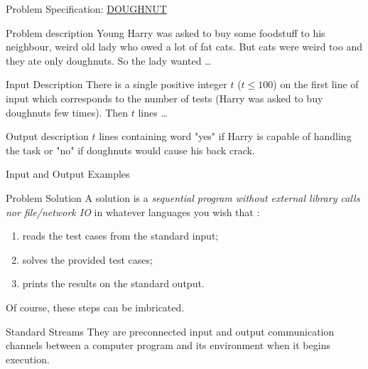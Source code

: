 \documentclass{beamer}
\begin{document}

\begin{frame}{Problem Specification: \href{https://www.spoj.com/problems/DOUGHNUT/}{DOUGHNUT}}
  \begin{block}{Problem description}
    Young Harry was asked to buy some foodstuff to his neighbour, weird old lady who owed a lot of fat cats. But cats were weird too and they ate only doughnuts. So the lady wanted \dots
  \end{block}

  \begin{block}{Input Description}
    There is a single positive integer $t$ ($t \leq 100$) on the first line of input which corresponds to the number of tests (Harry was asked to buy doughnuts few times). Then $t$ lines \dots
  \end{block}

  \begin{block}{Output description}
    $t$ lines containing word "yes" if Harry is capable of handling the task or "no" if doughnuts would cause his back crack.
  \end{block}

  \begin{block}{Input and Output Examples}
  \end{block}

\end{frame}




\begin{frame}{Problem Solution}
  A solution is a \emph{sequential program without external library calls nor file/network IO} in whatever languages you wish that :
  \begin{enumerate}
  \item reads the test cases from the standard input;
  \item solves the provided test cases;
  \item prints the results on the standard output.
  \end{enumerate}
  Of course, these steps can be imbricated.

  \begin{block}{Standard Streams}
    They are preconnected input and output communication channels between a computer program and its environment when it begins execution.
  \end{block}
\end{frame}
\end{document}
